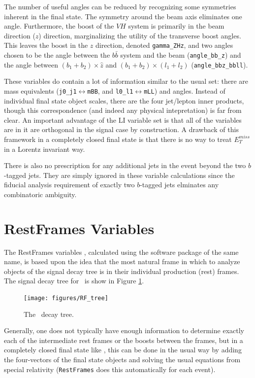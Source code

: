   The number of useful angles can be reduced by recognizing some symmetries inherent in the final state.  The symmetry around the beam axis eliminates one angle.  Furthermore, the boost of the $VH$ system is primarily in the beam direction ($z$) direction, marginalizing the utility of the transverse boost angles.  This leaves the boost in the $z$ direction, denoted \texttt{gamma\_ZHz}, and two angles chosen to be the angle between the $b\bar{b}$ system and the beam (\texttt{angle\_bb\_z}) and the angle between $\left(b_1+b_2\right)\times\hat{z}$ and $\left(b_1+b_2\right)\times\left(l_1+l_2\right)$ (\texttt{angle\_bbz\_bbll}).

These variables do contain a lot of information similar to the usual set: there are mass equivalents (\texttt{j0\_j1}$\leftrightarrow$\texttt{mBB}, and \texttt{l0\_l1}$\leftrightarrow$\texttt{mLL}) and angles.  Instead of individual final state object scales, there are the four jet/lepton inner products, though this correspondence (and indeed any physical intepretation) is far from clear.  An important advantage of the LI variable set is that all of the variables are in it are orthogonal in the signal case by construction.  A drawback of this framework in a completely closed final state is that there is no way to treat $E_T^{miss}$ in a Lorentz invariant way.  %

  There is also no prescription for any additional jets in the event beyond the two $b$-tagged jets.  They are simply ignored in these variable calculations since the fiducial analysis requirement of exactly two $b$-tagged jets elminates any combinatoric ambiguity.  

\section{RestFrames Variables}
The RestFrames variables \cite{rjr}, calculated using the software package of the same name, is based upon the idea that the most natural frame in which to analyze objects of the signal decay tree is in their individual production (rest) frames.  The signal decay tree for \ZH\, is show in Figure \ref{fig:rftree}.
\begin{figure}[!htbp]\captionsetup{justification=centering}
  \centering
  \texttt{[image: figures/RF\_tree]}
  \caption{The \ZH\, decay tree.}
  \label{fig:rftree}
\end{figure}
Generally, one does not typically have enough information to determine exactly each of the intermediate rest frames or the boosts between the frames, but in a completely closed final state like \ZH, this can be done in the usual way by adding the four-vectors of the final state objects and solving the usual equations from special relativity (\texttt{RestFrames} does this automatically for each event).

